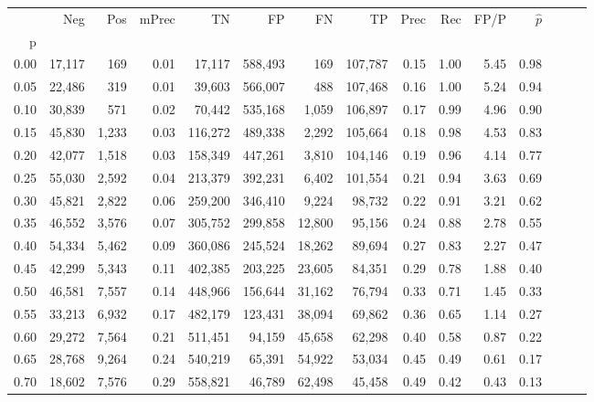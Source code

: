 \begin{tabular}{rrrrrrrrrrrrrrr}
\toprule
{} &     Neg &    Pos & mPrec &       TN &       FP &       FN &       TP &  Prec &   Rec &  FP/P & $\hat{p}$ \\
p    &         &        &       &          &          &          &          &       &       &       &           \\
\midrule
0.00 &  17,117 &    169 &  0.01 &   17,117 &  588,493 &      169 &  107,787 &  0.15 &  1.00 &  5.45 &      0.98 \\
0.05 &  22,486 &    319 &  0.01 &   39,603 &  566,007 &      488 &  107,468 &  0.16 &  1.00 &  5.24 &      0.94 \\
0.10 &  30,839 &    571 &  0.02 &   70,442 &  535,168 &    1,059 &  106,897 &  0.17 &  0.99 &  4.96 &      0.90 \\
0.15 &  45,830 &  1,233 &  0.03 &  116,272 &  489,338 &    2,292 &  105,664 &  0.18 &  0.98 &  4.53 &      0.83 \\
0.20 &  42,077 &  1,518 &  0.03 &  158,349 &  447,261 &    3,810 &  104,146 &  0.19 &  0.96 &  4.14 &      0.77 \\
0.25 &  55,030 &  2,592 &  0.04 &  213,379 &  392,231 &    6,402 &  101,554 &  0.21 &  0.94 &  3.63 &      0.69 \\
0.30 &  45,821 &  2,822 &  0.06 &  259,200 &  346,410 &    9,224 &   98,732 &  0.22 &  0.91 &  3.21 &      0.62 \\
0.35 &  46,552 &  3,576 &  0.07 &  305,752 &  299,858 &   12,800 &   95,156 &  0.24 &  0.88 &  2.78 &      0.55 \\
0.40 &  54,334 &  5,462 &  0.09 &  360,086 &  245,524 &   18,262 &   89,694 &  0.27 &  0.83 &  2.27 &      0.47 \\
0.45 &  42,299 &  5,343 &  0.11 &  402,385 &  203,225 &   23,605 &   84,351 &  0.29 &  0.78 &  1.88 &      0.40 \\
0.50 &  46,581 &  7,557 &  0.14 &  448,966 &  156,644 &   31,162 &   76,794 &  0.33 &  0.71 &  1.45 &      0.33 \\
0.55 &  33,213 &  6,932 &  0.17 &  482,179 &  123,431 &   38,094 &   69,862 &  0.36 &  0.65 &  1.14 &      0.27 \\
0.60 &  29,272 &  7,564 &  0.21 &  511,451 &   94,159 &   45,658 &   62,298 &  0.40 &  0.58 &  0.87 &      0.22 \\
0.65 &  28,768 &  9,264 &  0.24 &  540,219 &   65,391 &   54,922 &   53,034 &  0.45 &  0.49 &  0.61 &      0.17 \\
0.70 &  18,602 &  7,576 &  0.29 &  558,821 &   46,789 &   62,498 &   45,458 &  0.49 &  0.42 &  0.43 &      0.13 \\

\end{tabular}
